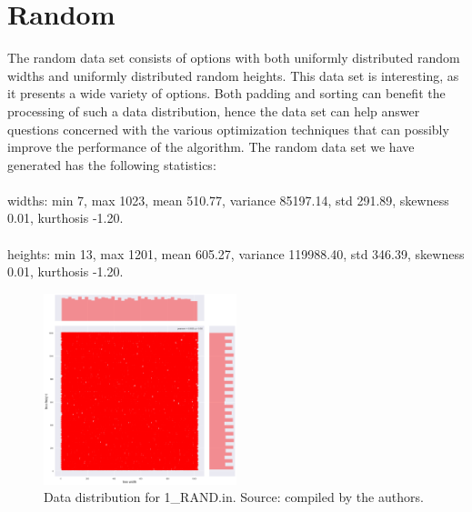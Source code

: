 \section{Random}
The random data set consists of options with both uniformly distributed random widths and uniformly distributed random heights. This data set is interesting, as it presents a wide variety of options. Both padding and sorting can benefit the processing of such a data distribution, hence the data set can help answer questions concerned with the various optimization techniques that can possibly improve the performance of the algorithm. The random data set we have generated has the following statistics: \\\\
widths: min 7, max 1023, mean 510.77, variance 85197.14, std 291.89, skewness 0.01, kurthosis -1.20.\\\\
heights: min 13, max 1201, mean 605.27, variance 119988.40, std 346.39, skewness 0.01, kurthosis -1.20.

\begin{figure}[H]
	\centering
	\includegraphics[width=0.5\textwidth]{img/1_RAND_plot.png}
	\caption{Data distribution for 1\_RAND.in. Source: compiled by the authors.}
	\label{fig:data:random}
\end{figure}

